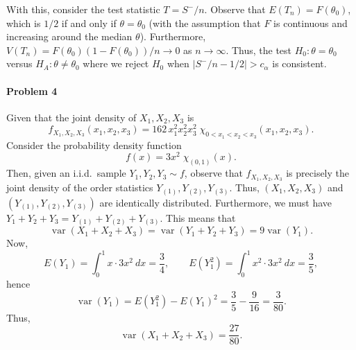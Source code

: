 \documentclass[10pt]{article}
\DeclareMathOperator*{\var}{var}
\begin{document}
    With this, consider the test statistic $T = S^-/n$. Observe that $E(T_n) =
    F(\theta_0)$, which is $1/2$ if and only if $\theta = \theta_0$ (with the
    assumption that $F$ is continuous and increasing around the median
    $\theta$). Furthermore, $V(T_n) = F(\theta_0)(1 - F(\theta_0)) / n \to 0$
    as $n \to \infty$. Thus, the test $H_0: \theta = \theta_0$ versus $H_A:
    \theta \neq \theta_0$ where we reject $H_0$ when $|S^-/n - 1/2| >
    c_\alpha$ is consistent.




    \paragraph{Problem 4} Given that the joint density of $X_1, X_2, X_3$ is
    \[
        f_{X_1, X_2, X_3}(x_1, x_2, x_3) = 162\, x_1^2 x_2^2 x_3^2 \;
            \chi_{0 < x_1 < x_2 < x_3}(x_1, x_2, x_3).
    \] Consider the probability density function \[
        f(x) = 3x^2\; \chi_{(0, 1)}(x).
    \] Then, given an i.i.d.\ sample $Y_1, Y_2, Y_3 \sim f$, observe that
    $f_{X_1, X_2, X_3}$ is precisely the joint density of the order statistics
    $Y_{(1)}, Y_{(2)}, Y_{(3)}$. Thus, $(X_1, X_2, X_3)$ and $(Y_{(1)},
    Y_{(2)}, Y_{(3)})$ are identically distributed. Furthermore, we must have
    $Y_1 + Y_2 + Y_3 = Y_{(1)} + Y_{(2)} + Y_{(3)}$. This means that \[
        \var(X_1 + X_2 + X_3) = \var(Y_1 + Y_2 + Y_3) = 9 \var(Y_1).
    \] Now, \[
        E(Y_1) = \int_0^1 x\cdot 3x^2 \:dx = \frac{3}{4}, \qquad
        E(Y_1^2) = \int_0^1 x^2\cdot 3x^2 \:dx = \frac{3}{5},
    \] hence \[
        \var(Y_1) = E(Y_1^2) - E(Y_1)^2 = \frac{3}{5} -
        \frac{9}{16} = \frac{3}{80}.
    \] Thus, \[
        \var(X_1 + X_2 + X_3) = \frac{27}{80}.
    \]
\end{document}
